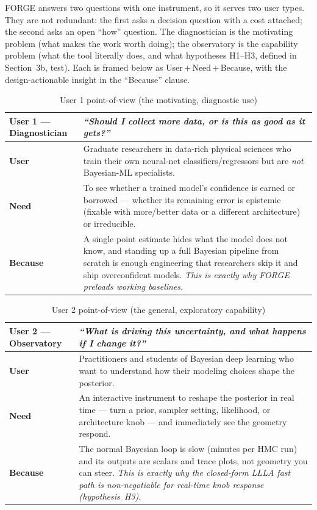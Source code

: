 FORGE answers two questions with one instrument, so it serves two user types. They are not redundant: the first asks a decision question with a cost attached; the second asks an open ``how'' question. The diagnostician is the motivating problem (what makes the work worth doing); the observatory is the capability problem (what the tool literally does, and what hypotheses H1--H3, defined in Section~3b, test). Each is framed below as User\,+\,Need\,+\,Because, with the design-actionable insight in the ``Because'' clause.

\begin{table}[H]
\centering\renewcommand{\arraystretch}{1.3}
\begin{tabularx}{\linewidth}{|l|Y|}
\hline
\textbf{User 1 --- Diagnostician} & \textit{``Should I collect more data, or is this as good as it gets?''} \\ \hline
\textbf{User} & Graduate researchers in data-rich physical sciences who train their own neural-net classifiers/regressors but are \emph{not} Bayesian-ML specialists. \\ \hline
\textbf{Need} & To see whether a trained model's confidence is earned or borrowed --- whether its remaining error is epistemic (fixable with more/better data or a different architecture) or irreducible. \\ \hline
\textbf{Because} & A single point estimate hides what the model does not know, and standing up a full Bayesian pipeline from scratch is enough engineering that researchers skip it and ship overconfident models. \emph{This is exactly why FORGE preloads working baselines.} \\ \hline
\end{tabularx}
\caption{User 1 point-of-view (the motivating, diagnostic use)}
\end{table}

\begin{table}[H]
\centering\renewcommand{\arraystretch}{1.3}
\begin{tabularx}{\linewidth}{|l|Y|}
\hline
\textbf{User 2 --- Observatory} & \textit{``What is driving this uncertainty, and what happens if I change it?''} \\ \hline
\textbf{User} & Practitioners and students of Bayesian deep learning who want to understand how their modeling choices shape the posterior. \\ \hline
\textbf{Need} & An interactive instrument to reshape the posterior in real time --- turn a prior, sampler setting, likelihood, or architecture knob --- and immediately see the geometry respond. \\ \hline
\textbf{Because} & The normal Bayesian loop is slow (minutes per HMC run) and its outputs are scalars and trace plots, not geometry you can steer. \emph{This is exactly why the closed-form LLLA fast path is non-negotiable for real-time knob response (hypothesis~H3).} \\ \hline
\end{tabularx}
\caption{User 2 point-of-view (the general, exploratory capability)}
\end{table}

